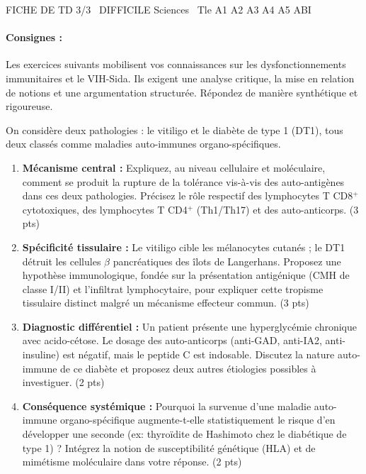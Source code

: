 \documentclass[11pt]{article}
\begin{document}
\begin{tcolorbox}[enhanced,colback=popink,colframe=popink,arc=10pt,boxrule=0pt,left=12pt,right=12pt,top=9pt,bottom=9pt]
{\color{white}\popxbold\small FICHE DE TD 3/3 \textbullet\ DIFFICILE \hfill Sciences \textbullet\ Tle A1 A2 A3 A4 A5 ABI\par}
\end{tcolorbox}
\vspace{4pt}
\paragraph{Consignes :} Les exercices suivants mobilisent vos connaissances sur les dysfonctionnements immunitaires et le VIH-Sida. Ils exigent une analyse critique, la mise en relation de notions et une argumentation structurée. Répondez de manière synthétique et rigoureuse.

\begin{exercice}
On considère deux pathologies : le vitiligo et le diabète de type 1 (DT1), tous deux classés comme maladies auto-immunes organo-spécifiques.
\begin{enumerate}
    \item \textbf{Mécanisme central :} Expliquez, au niveau cellulaire et moléculaire, comment se produit la rupture de la tolérance vis-à-vis des auto-antigènes dans ces deux pathologies. Précisez le rôle respectif des lymphocytes T CD8$^+$ cytotoxiques, des lymphocytes T CD4$^+$ (Th1/Th17) et des auto-anticorps. (3 pts)
    \item \textbf{Spécificité tissulaire :} Le vitiligo cible les mélanocytes cutanés ; le DT1 détruit les cellules $\beta$ pancréatiques des îlots de Langerhans. Proposez une hypothèse immunologique, fondée sur la présentation antigénique (CMH de classe I/II) et l'infiltrat lymphocytaire, pour expliquer cette tropisme tissulaire distinct malgré un mécanisme effecteur commun. (3 pts)
    \item \textbf{Diagnostic différentiel :} Un patient présente une hyperglycémie chronique avec acido-cétose. Le dosage des auto-anticorps (anti-GAD, anti-IA2, anti-insuline) est négatif, mais le peptide C est indosable. Discutez la nature auto-immune de ce diabète et proposez deux autres étiologies possibles à investiguer. (2 pts)
    \item \textbf{Conséquence systémique :} Pourquoi la survenue d'une maladie auto-immune organo-spécifique augmente-t-elle statistiquement le risque d'en développer une seconde (ex: thyroïdite de Hashimoto chez le diabétique de type 1) ? Intégrez la notion de susceptibilité génétique (HLA) et de mimétisme moléculaire dans votre réponse. (2 pts)
\end{enumerate}
\end{exercice}
\end{document}
